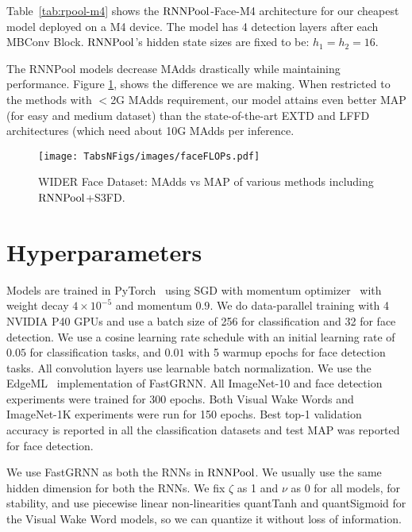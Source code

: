 \documentclass[10pt]{article}
\newcommand{\rpool}{\ensuremath{{\rm RNNPool}}\xspace}
\begin{document}
Table~\ref{tab:rpool-m4} shows the \rpool-Face-M4 architecture for our cheapest model deployed on a M4 device. The model has 4 detection layers after each MBConv Block. \rpool's hidden state sizes are fixed to be: $h_1=h_2=16$.

The RNNPool models decrease MAdds drastically while maintaining performance. Figure \ref{fig:facedetection}, shows the difference we are making. When restricted to the methods with $<$2G MAdds requirement, our model attains even better MAP (for easy and medium dataset) than the state-of-the-art EXTD and LFFD architectures (which need about  10G MAdds per inference.
\begin{figure*}[h]
	\texttt{[image: TabsNFigs/images/faceFLOPs.pdf]}
	\caption{WIDER Face Dataset: MAdds  vs MAP of various methods including \rpool+S3FD.}
	\label{fig:facedetection}
	\vspace{-5mm}
\end{figure*}  
\section{Hyperparameters}
\label{sec:hyperparams}
Models are trained in PyTorch~\citep{paszke2019pytorch} using SGD with
momentum optimizer~\citep{sutskever2013importance} with weight decay
$4\times 10^{-5}$ and momentum $ 0.9$.  We do data-parallel training
with 4 NVIDIA P40 GPUs and use a batch size of 256 for classification
and 32 for face detection.  We use a cosine learning rate schedule
with an initial learning rate of $0.05$ for classification tasks, and
$0.01$ with 5 warmup epochs for face detection tasks. All convolution
layers use learnable batch normalization. We use the
EdgeML~\citep{edgeml04} implementation of FastGRNN. All ImageNet-10 and face detection
experiments were trained for 300 epochs. Both Visual Wake Words and ImageNet-1K experiments were run for 150 epochs. Best top-1 validation accuracy is reported in all the classification datasets and test MAP was reported for face detection. 

We use FastGRNN as both the RNNs in \rpool. We usually use the same hidden
dimension for both the RNNs. We fix $\zeta$ as 1 and $\nu$ as 0 for
all models, for stability, and use piecewise linear non-linearities
quantTanh and quantSigmoid for the Visual Wake Word models, so we can
quantize it without loss of information.
\end{document}
